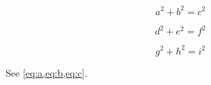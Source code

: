 \documentclass{article}
\begin{document}
\begin{equation} \label{eq:a}
	a^2 + b^2 = c^2
\end{equation}

\begin{equation} \label{eq:b}
	d^2 + e^2 = f^2
\end{equation}

\begin{equation} \label{eq:c}
	g^2 + h^2 = i^2
\end{equation}

See \cref{eq:a,eq:b,eq:c}.
\end{document}
